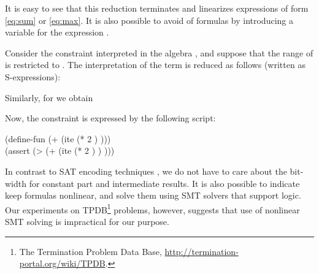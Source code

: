 \documentclass{llncs}
\begin{document}
It is easy to see that this reduction terminates and
linearizes expressions of form \eqref{eq:sum} or \eqref{eq:max}.
It is also possible to avoid  of formulas
by introducing a  variable for the  expression .

\def\ff{\mathsf{f}}
\def\aa{\mathsf{a}}
\def\bb{\mathsf{b}}
\begin{example}
\def\ccff{c_{\kern.1em\ff,1}}
\def\bbff{b_{\kern.1em\ff,1}}
	Consider the constraint 
	interpreted in the algebra , and
	suppose that the range of  is restricted to .
	The interpretation of the term  is
	reduced as follows (written as S-expressions):
	
	Similarly, for  we obtain
	
	Now, the constraint  is expressed by the
	following script:
	\begin{Script}
		(define-fun  (+  (ite  (* 2 ) )))\\
		(assert (> (+  (ite  (* 2 ) ) )))
	\end{Script}
\end{example}

In contrast to SAT encoding techniques \cite{FGMSTZ07,FGMSTZ08,EWZ08},
we do not have to care about the bit-width for constant part and
intermediate results.
It is also possible to indicate  keep formulas nonlinear,
and solve them using SMT solvers that support  logic.
Our experiments on TPDB\footnote{The Termination Problem Data Base,
\url{http://termination-portal.org/wiki/TPDB}.}
problems, however, suggests
that use of nonlinear SMT solving is impractical for our purpose.
\end{document}
